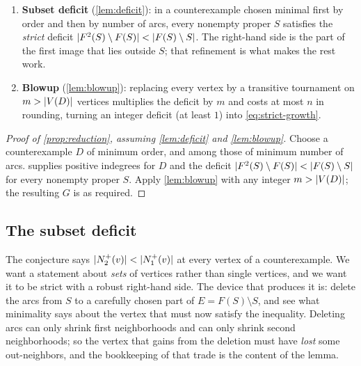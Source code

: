 
\begin{planbox}
\begin{enumerate}[leftmargin=1.3em,itemsep=1pt,topsep=1pt]
\item \textbf{Subset deficit} (\cref{lem:deficit}): in a counterexample chosen minimal first by
  order and then by number of arcs, every nonempty proper $S$ satisfies the \emph{strict} deficit
  $\lvert F^2(S)\setminus F(S)\rvert<\lvert F(S)\setminus S\rvert$. The right-hand side is the part of the first
  image that lies outside $S$; that refinement is what makes the rest work.
\item \textbf{Blowup} (\cref{lem:blowup}): replacing every vertex by a transitive tournament on
  $m>\lvert V(D)\rvert$ vertices multiplies the deficit by $m$ and costs at most $n$ in rounding, turning
  an integer deficit (at least $1$) into \eqref{eq:strict-growth}.
\end{enumerate}
\end{planbox}

\begin{proof}[Proof of \cref{prop:reduction}, assuming \cref{lem:deficit} and \cref{lem:blowup}]
Choose a counterexample $D$ of minimum order, and among those of minimum number of arcs.
 supplies positive indegrees for $D$ and the deficit
$\lvert F^2(S)\setminus F(S)\rvert<\lvert F(S)\setminus S\rvert$ for every nonempty proper $S$. Apply
\cref{lem:blowup} with any integer $m>\lvert V(D)\rvert$; the resulting $G$ is as required.
\end{proof}

\subsection{The subset deficit}\label{sec:deficit}

\begin{ideabox}
The conjecture says $\lvert N_2^+(v)\rvert<\lvert N_1^+(v)\rvert$ at every vertex of a counterexample. We want a
statement about \emph{sets} of vertices rather than single vertices, and we want it to be strict
with a robust right-hand side. The device that produces it is: delete the arcs from $S$ to a
carefully chosen part of $E=F(S)\setminus S$, and see what minimality says about the vertex that
must now satisfy the inequality. Deleting arcs can only shrink first neighborhoods and can only
shrink second neighborhoods; so the vertex that gains from the deletion must have \emph{lost} some
out-neighbors, and the bookkeeping of that trade is the content of the lemma.
\end{ideabox}

